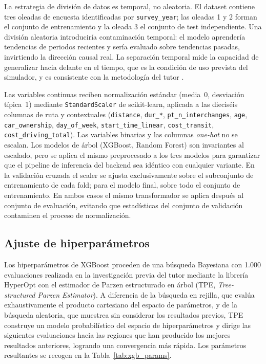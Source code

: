 La estrategia de división de datos es temporal, no aleatoria. El dataset contiene tres oleadas de encuesta identificadas por \texttt{survey\_year}; las oleadas 1 y 2 forman el conjunto de entrenamiento y la oleada 3 el conjunto de test independiente. Una división aleatoria introduciría contaminación temporal: el modelo aprendería tendencias de periodos recientes y sería evaluado sobre tendencias pasadas, invirtiendo la dirección causal real. La separación temporal mide la capacidad de generalizar hacia delante en el tiempo, que es la condición de uso prevista del simulador, y es consistente con la metodología del tutor \cite{MartinBaos2023Thesis}.

Las variables continuas reciben normalización estándar (media~0, desviación típica~1) mediante \texttt{StandardScaler} de scikit-learn, aplicada a las dieciséis columnas de ruta y contextuales (\texttt{distance}, \texttt{dur\_*}, \texttt{pt\_n\_interchanges}, \texttt{age}, \texttt{car\_ownership}, \texttt{day\_of\_week}, \texttt{start\_time\_linear}, \texttt{cost\_transit}, \texttt{cost\_driving\_total}). Las variables binarias y las columnas \textit{one-hot} no se escalan. Los modelos de árbol (XGBoost, Random Forest) son invariantes al escalado, pero se aplica el mismo preprocesado a los tres modelos para garantizar que el pipeline de inferencia del backend sea idéntico con cualquier variante. En la validación cruzada el scaler se ajusta exclusivamente sobre el subconjunto de entrenamiento de cada fold; para el modelo final, sobre todo el conjunto de entrenamiento. En ambos casos el mismo transformador se aplica después al conjunto de evaluación, evitando que estadísticas del conjunto de validación contaminen el proceso de normalización.

\subsection{Ajuste de hiperparámetros}
\label{subsec:impl_lpmc_hiperparametros}

Los hiperparámetros de XGBoost proceden de una búsqueda Bayesiana con 1.000 evaluaciones realizada en la investigación previa del tutor \cite{MartinBaos2023Thesis} mediante la librería HyperOpt con el estimador de Parzen estructurado en árbol (TPE, \textit{Tree-structured Parzen Estimator}). A diferencia de la búsqueda en rejilla, que evalúa exhaustivamente el producto cartesiano del espacio de parámetros, y de la búsqueda aleatoria, que muestrea sin considerar los resultados previos, TPE construye un modelo probabilístico del espacio de hiperparámetros y dirige las siguientes evaluaciones hacia las regiones que han producido los mejores resultados anteriores, logrando una convergencia más rápida. Los parámetros resultantes se recogen en la Tabla~\ref{tab:xgb_params}.

